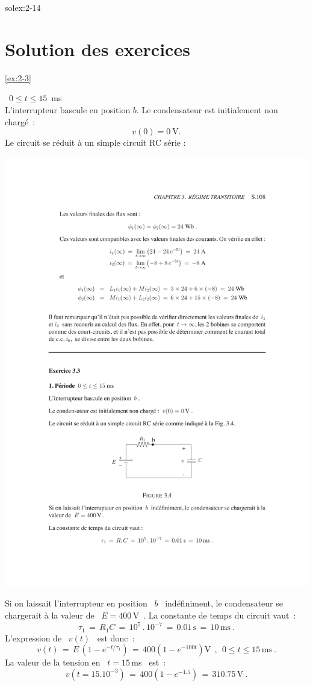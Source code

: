 \begin{exwithsol}{solex:2-14}
\begin{exercise}{}
\end{exercise}


\section{Solution des exercices}
\begin{solexercise}{\ref{ex:2-3}}
	\label{solex:2-3}

 \ $0 \leq t \leq 15$~ms\\
L'interrupteur bascule en position $b$. 
Le condensateur est initialement non charg\'e~: $$v(0) = 0 \ \text{V}.$$
Le circuit se r\'eduit \`a un simple circuit RC s\'erie :
\begin{center}
\includegraphics[width=0.55\linewidth]{sol_exercices/ex3-3-1}
\end{center}
Si on laissait l'interrupteur en position \ $b$ \ ind\'efiniment, le
condensateur se chargerait \`a la valeur de \ $E = 400\,$V~.
La constante de temps du circuit vaut~:
\[ \tau_1 \, = \, R_1C \, = \, 10^5\, . \, 10^{-7}\, 
= \, 0.01\,\mbox{s}\, = \, 10\,\mbox{ms}~. \]
L'expression de \ $v(t)$ \ est donc~:
\[ v(t) \, = \, E\, \left( 1-e^{-t/\tau_1}\right)  \, 
= \, 400\left( 1 - e^{-100t}\right) \mbox{V}~~, ~~0 \leq t \leq 15\,\mbox{ms}~. \] 
La valeur de la tension en \ $t=15\,$ms \ est~:
\[ v \left( t=15.10^{-3}\right) \, = \, 400\left( 1-e^{-1.5}\right) \, 
= \, 310.75\,\mbox{V}~. \]


\end{solexercise}
\end{exwithsol}
